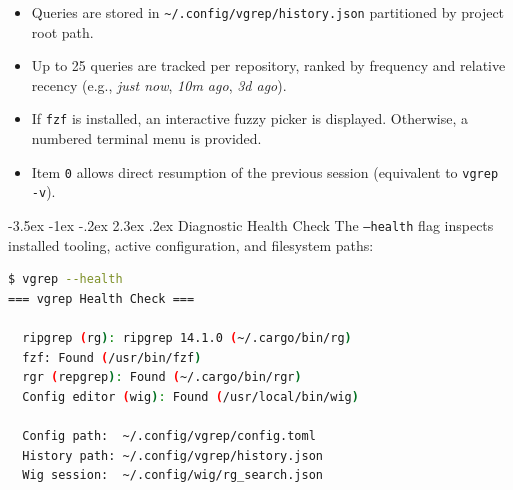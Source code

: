 \documentclass[11pt,a4paper]{article}
\makeatletter
\renewcommand{\section}{\@startsection{section}{1}{\z@}%
  {-3.5ex \@plus -1ex \@minus -.2ex}%
  {2.3ex \@plus .2ex}%
  {\normalfont\Large\bfseries\color{MidnightBlue}}}
\makeatother
\begin{document}
\begin{itemize}[leftmargin=1.5em]
    \item Queries are stored in \texttt{\textasciitilde/.config/vgrep/history.json} partitioned by project root path.
    \item Up to 25 queries are tracked per repository, ranked by frequency and relative recency (e.g., \textit{just now}, \textit{10m ago}, \textit{3d ago}).
    \item If \texttt{fzf} is installed, an interactive fuzzy picker is displayed. Otherwise, a numbered terminal menu is provided.
    \item Item \texttt{0} allows direct resumption of the previous session (equivalent to \texttt{vgrep -v}).
\end{itemize}

\section{Diagnostic Health Check}
The \texttt{--health} flag inspects installed tooling, active configuration, and filesystem paths:

\begin{lstlisting}[language=bash]
$ vgrep --health
=== vgrep Health Check ===

  ripgrep (rg): ripgrep 14.1.0 (~/.cargo/bin/rg)
  fzf: Found (/usr/bin/fzf)
  rgr (repgrep): Found (~/.cargo/bin/rgr)
  Config editor (wig): Found (/usr/local/bin/wig)

  Config path:  ~/.config/vgrep/config.toml
  History path: ~/.config/vgrep/history.json
  Wig session:  ~/.config/wig/rg_search.json
\end{lstlisting}
\end{document}

